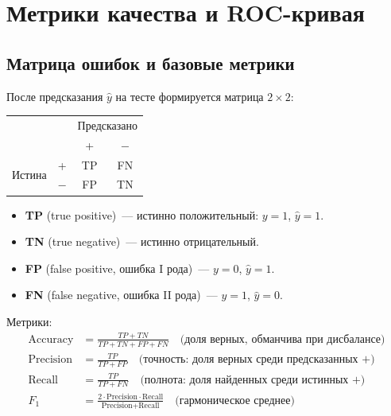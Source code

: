 \documentclass[12pt,a4paper]{article}
\begin{document}
\section{Метрики качества и ROC-кривая}

\subsection{Матрица ошибок и базовые метрики}

После предсказания $\hat{y}$ на тесте формируется матрица $2 \times 2$:

\begin{center}
\begin{tabular}{cc|cc}
& & \multicolumn{2}{c}{Предсказано}\\
& & + & −\\\hline
\multirow{2}{*}{Истина} & + & TP & FN\\
& − & FP & TN\\
\end{tabular}
\end{center}

\begin{itemize}
  \item \textbf{TP} (true positive)~--- истинно положительный: $y = 1$, $\hat{y} = 1$.
  \item \textbf{TN} (true negative)~--- истинно отрицательный.
  \item \textbf{FP} (false positive, ошибка I рода)~--- $y = 0$, $\hat{y} = 1$.
  \item \textbf{FN} (false negative, ошибка II рода)~--- $y = 1$, $\hat{y} = 0$.
\end{itemize}

Метрики:
\begin{align*}
  \text{Accuracy} &= \frac{TP + TN}{TP + TN + FP + FN} \quad \text{(доля верных, обманчива при дисбалансе)}\\
  \text{Precision} &= \frac{TP}{TP + FP} \quad \text{(точность: доля верных среди предсказанных +)}\\
  \text{Recall} &= \frac{TP}{TP + FN} \quad \text{(полнота: доля найденных среди истинных +)}\\
  F_1 &= \frac{2 \cdot \text{Precision} \cdot \text{Recall}}{\text{Precision} + \text{Recall}} \quad \text{(гармоническое среднее)}
\end{align*}
\end{document}
